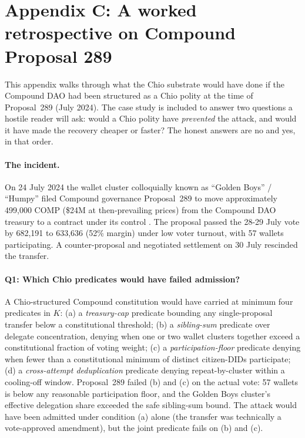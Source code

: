 \section{Appendix C: A worked retrospective on Compound Proposal 289}
\label{sec:appendix-c}

This appendix walks through what the Chio substrate would have done if the Compound DAO had been structured as a Chio polity at the time of Proposal~289 (July 2024). The case study is included to answer two questions a hostile reader will ask: would a Chio polity have \emph{prevented} the attack, and would it have made the recovery cheaper or faster? The honest answers are no and yes, in that order.

\paragraph{The incident.}
On 24 July 2024 the wallet cluster colloquially known as ``Golden Boys'' / ``Humpy'' filed Compound governance Proposal~289 to move approximately 499{,}000 COMP (\$24M at then-prevailing prices) from the Compound DAO treasury to a contract under its control \cite{compoundProposal289}. The proposal passed the 28-29 July vote by 682{,}191 to 633{,}636 (52\% margin) under low voter turnout, with 57 wallets participating. A counter-proposal and negotiated settlement on 30 July rescinded the transfer.

\paragraph{Q1: Which Chio predicates would have failed admission?}
A Chio-structured Compound constitution would have carried at minimum four predicates in $K$: (a) a \emph{treasury-cap} predicate bounding any single-proposal transfer below a constitutional threshold; (b) a \emph{sibling-sum} predicate over delegate concentration, denying when one or two wallet clusters together exceed a constitutional fraction of voting weight; (c) a \emph{participation-floor} predicate denying when fewer than a constitutional minimum of distinct citizen-DIDs participate; (d) a \emph{cross-attempt deduplication} predicate denying repeat-by-cluster within a cooling-off window. Proposal~289 failed (b) and (c) on the actual vote: 57 wallets is below any reasonable participation floor, and the Golden Boys cluster's effective delegation share exceeded the safe sibling-sum bound. The attack would have been admitted under condition (a) alone (the transfer was technically a vote-approved amendment), but the joint predicate fails on (b) and (c).

